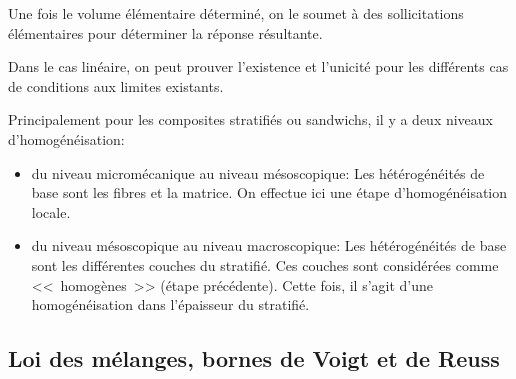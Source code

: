 \medskip
Une fois le volume élémentaire déterminé, on le soumet à des sollicitations élémentaires
pour déterminer la réponse résultante. 

\medskip
Dans le cas linéaire, on peut prouver l'existence et l'unicité pour les différents cas de
conditions aux limites existants.

\medskip
Principalement pour les composites stratifiés ou sandwichs, il y a deux niveaux d'homogénéisation:
\begin{itemize}
	\item du niveau micromécanique au niveau mésoscopique:
		Les hétérogénéités de base sont les fibres et la matrice. On effectue ici
		 une étape d'homogénéisation locale.
	\item du niveau mésoscopique au niveau macroscopique:
		Les hétérogénéités de base sont les différentes couches du stratifié.
		 Ces couches sont considérées comme <<~homogènes~>> (étape précédente).
		 Cette fois, il s'agit d'une homogénéisation dans l'épaisseur du stratifié.
\end{itemize}



\medskip
\subsection{Loi des mélanges, bornes de Voigt et de Reuss}

